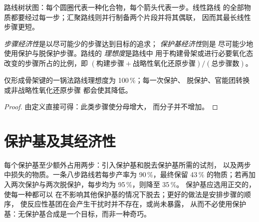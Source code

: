 \begin{omfigure}

{\small 路线树状图：每个圆圈代表一种化合物，每个箭头代表一步。线性路线
的全部物质都要经过每一步；汇聚路线则并行制备两个片段并将其偶联，
因而其最长线性步骤更短。}
\end{omfigure}

\begin{definition}[经济性与理想度]\label{def:b3:total-synthesis:economy}
\emph{步骤经济性}是以尽可能少的步骤达到目标的追求；
\emph{保护基经济性}则是
尽可能少地使用保护与脱保护步骤。路线的
\emph{理想度}是路线中
用于构建骨架或进行必要氧化态改变的步骤所占的比例，即
$(\text{构建步骤} + \text{战略性氧化还原步骤})/(\text{总步骤数})$。
\end{definition}

\begin{proposition}[路线的理想度]\label{prop:b3:total-synthesis:ideality}
仅形成骨架键的一锅法路线理想度为 100\,\%；每一次保护、
脱保护、官能团转换或非战略性氧化还原步骤
都会使其降低。
\end{proposition}

\begin{proof}
由定义直接可得：此类步骤使分母增大，
而分子并不增加。
\end{proof}

\section{保护基及其经济性}

每个保护基至少额外占用两步：引入保护基和脱去保护基所需的试剂，
以及两步中损失的物质。一条八步路线若每步产率为 90\,\%，最终保留
43\,\% 的物质；若再加入两次保护与两次脱保护，每步均为 95\,\%，则降至 35\,\%。
保护基应选用正交的，使每一种都可以
在不影响其他保护基的情况下脱去；更好的做法是安排步骤的顺序，
使反应性基团在会产生干扰时并不存在，或尚未暴露，
从而不必使用保护基：无保护基合成是一个目标，而非一种奇巧。

